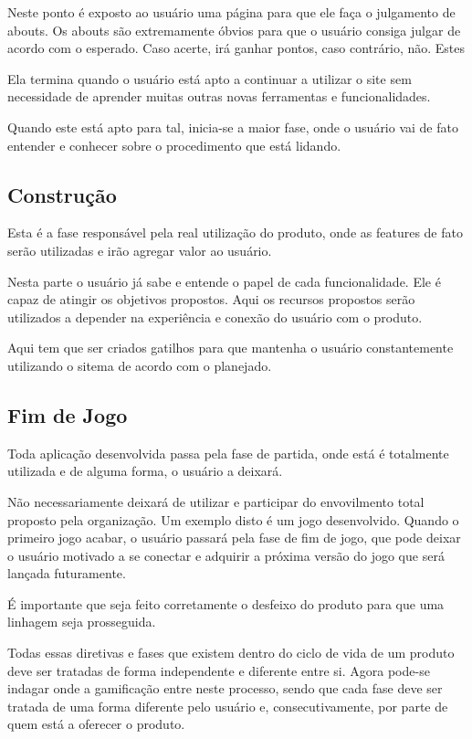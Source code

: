 Neste ponto é exposto ao usuário uma página para que ele faça o julgamento de abouts.
Os abouts são extremamente óbvios para que o usuário consiga julgar de acordo com o
esperado. Caso acerte, irá ganhar pontos, caso contrário, não. Estes 


Ela termina quando o usuário está apto a continuar a utilizar o site sem
necessidade de aprender muitas outras novas ferramentas e funcionalidades.

Quando este está apto para tal, inicia-se a maior fase, onde o usuário
vai de fato entender e conhecer sobre o procedimento que está lidando.

\subsection{Construção}
\label{sub:constru_o}
Esta é a fase responsável pela real utilização do produto, onde as features
de fato serão utilizadas e irão agregar valor ao usuário.

Nesta parte o usuário já sabe e entende o papel de cada funcionalidade. Ele é capaz
de atingir os objetivos propostos. Aqui os recursos propostos serão utilizados
a depender na experiência e conexão do usuário com o produto.

Aqui tem que ser criados gatilhos para que mantenha o usuário constantemente utilizando
o sitema de acordo com o planejado.

\subsection{Fim de Jogo}
\label{sub:fim_de_jogo}
Toda aplicação desenvolvida passa pela fase de partida, onde está é totalmente utilizada
e de alguma forma, o usuário a deixará. 

Não necessariamente deixará de utilizar e participar do envovilmento total proposto pela
organização. Um exemplo disto é um jogo desenvolvido. Quando o primeiro jogo acabar, o
usuário passará pela fase de fim de jogo, que pode deixar o usuário motivado a se conectar
e adquirir a próxima versão do jogo que será lançada futuramente.

É importante que seja feito corretamente o desfeixo do produto para que uma linhagem seja
prosseguida.


Todas essas diretivas e fases que existem dentro do ciclo de vida de um produto deve ser
tratadas de forma independente e diferente entre si. Agora pode-se indagar onde a gamificação
entre neste processo, sendo que cada fase deve ser tratada de uma forma diferente pelo
usuário e, consecutivamente, por parte de quem está a oferecer o produto.

